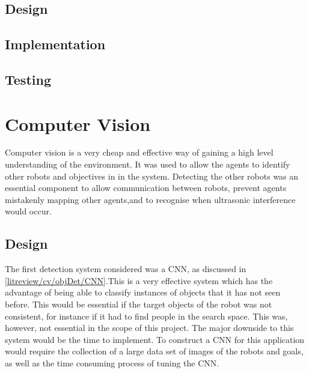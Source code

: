 \subsection{Design}\label{soft/SLAM/design}

\subsection{Implementation}\label{soft/SLAM/impl}

\subsection{Testing}\label{soft/SLAM/test}



\section{Computer Vision}\label{soft/cv}
Computer vision is a very cheap and effective way of gaining a high level understanding of the environment. It was used to allow the agents to identify other robots and objectives in in the system. Detecting the other robots was an essential component to allow communication between robots, prevent agents mistakenly mapping other agents,and to recognise when ultrasonic interference would occur. 

\subsection{Design}\label{soft/cv/design}
The first detection system considered was a CNN, as discussed in \ref{litreview/cv/objDet/CNN}.This is a very effective system which has the advantage of 
being able to classify instances of objects that it has not 
seen before. This would be essential if the target objects of 
the robot was not consistent, for instance if it had to find 
people in the search space. This was, however, not essential 
in the scope of this project. The major downside to this 
system would be the time to implement. To construct a CNN for 
this application would require the collection of a large data 
set of images of the robots and goals, as well as the time 
consuming process of tuning the CNN. 

